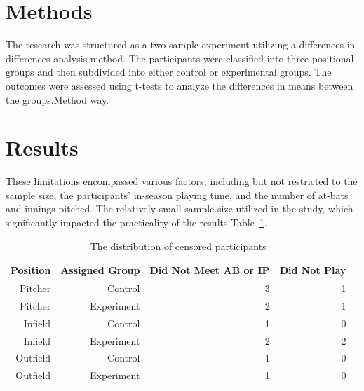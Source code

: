 \documentclass[12pt]{article}
\begin{document}
\section{Methods}
\label{sec:meth}
The research was structured as a two-sample experiment utilizing a differences-in-differences analysis method.
The participants were classified into three positional groups and then subdivided into either control or experimental groups. 
The outcomes were assessed using t-tests to analyze the differences in means between the groups.Method way\cite*{Dalmass2018baseball}.




\section{Results}
\label{sec:resu}
These limitations encompassed various factors, including but not restricted to the sample size, the participants' in-season playing time,
and the number of at-bats and innings pitched. The relatively small sample size utilized in the study, which significantly impacted the practicality of the results Table~\ref{tab:rv}.

\begin{table}[tbp]
  \caption{The distribution of censored participants}
  \label{tab:rv}
\centering
\begin{tabular}{rrrr}
  \toprule
  Position & Assigned Group & Did Not Meet AB or IP & Did Not Play\\ 
  \midrule
Pitcher & Control & 3 & 1\\
Pitcher & Experiment & 2 & 1\\
Infield & Control & 1 & 0 \\
Infield & Experiment & 2 & 2\\
Outfield & Control & 1 & 0\\
Outfield & Experiment & 1 & 0\\
  \bottomrule
\end{tabular}
\end{table}
\end{document}
